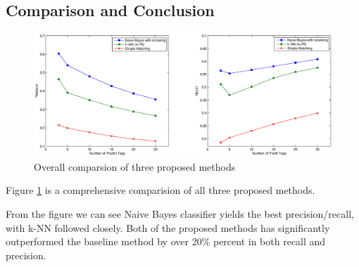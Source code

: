 \subsection{Comparison and Conclusion}
\begin{figure}[htb!]
\centering%
    \includegraphics[scale=0.40]{pic/compare}
\caption{Overall comparsion of three proposed methods}
\label{fig:compare}
\end{figure}

Figure \ref{fig:compare} is a comprehensive comparision of all three proposed methods.

From the figure we can see Naive Bayes classifier yields the best precision/recall, with k-NN followed closely. Both of the proposed methods has significantly outperformed the baseline method by over 20\% percent in both recall and precision.

